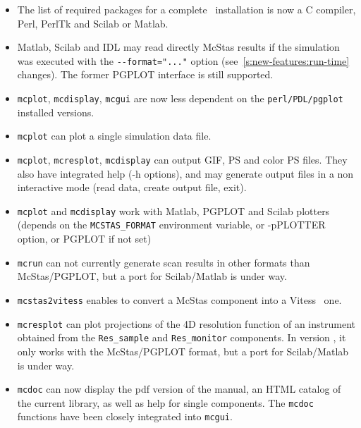\begin{itemize}
\item The list of required packages for a complete \MCS\ installation is now a C
    compiler, Perl, PerlTk and Scilab or Matlab.
\item Matlab, Scilab and IDL may read directly McStas results if the simulation
    was executed with the \verb+--format="..."+ option 
    (see~\ref{s:new-features:run-time} changes). The former PGPLOT interface is still
    supported. 
      
        
\item \verb+mcplot+, \verb+mcdisplay+, \verb+mcgui+ are now less dependent on the
    \verb+perl/PDL/pgplot+ installed versions. 
\item \verb+mcplot+ can plot a single simulation data file.
\item \verb+mcplot+, \verb+mcresplot+, \verb+mcdisplay+ can output GIF, PS and color
    PS files. They also have integrated help (-h options), and may generate output
    files in a non interactive mode (read data, create output file, exit).
\item \verb+mcplot+ and \verb+mcdisplay+ work with Matlab, PGPLOT and Scilab plotters
   (depends on the \verb+MCSTAS_FORMAT+ environment variable, or -pPLOTTER option, or
   PGPLOT if not set)
\item \verb+mcrun+ can not currently generate scan results in other formats than
   McStas/PGPLOT, but a port for Scilab/Matlab is under way. 
\item \verb+mcstas2vitess+ enables to convert a McStas component into a
   Vitess~\cite{vitess_webpage} one. 
\item \verb+mcresplot+ can plot projections of the 4D resolution function of an 
   instrument obtained from the \verb+Res_sample+ and \verb+Res_monitor+ components.
   In version \version, it only works with the McStas/PGPLOT format, 
   but a port for Scilab/Matlab is under way. 
\item \verb+mcdoc+ can now display the pdf version of the manual, an
  HTML catalog of the current library, as well as help for single
  components.  The \verb+mcdoc+ functions have been
  closely integrated into \verb+mcgui+. 
\end{itemize}

